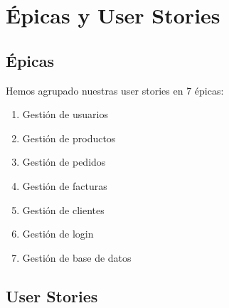 \chapter{Épicas y User Stories}

\section{Épicas}

Hemos agrupado nuestras user stories en 7 épicas:
\begin{enumerate}
    \item Gestión de usuarios
    \item Gestión de productos
    \item Gestión de pedidos
    \item Gestión de facturas
    \item Gestión de clientes
    \item Gestión de login
    \item Gestión de base de datos
\end{enumerate}

\section{User Stories}

